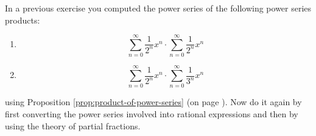 In a previous exercise you computed the power series of the following
power series products:
  \begin{enumerate}[nosep,label=(\alph*)]
  \item
    \[
    \sum_{n=0}^\infty \frac{1}{2^n} x^n
    \cdot
    \sum_{n=0}^\infty \frac{1}{2^n} x^n
    \]
  \item 
    \[
    \sum_{n=0}^\infty \frac{1}{2^n} x^n
    \cdot
    \sum_{n=0}^\infty \frac{1}{3^n} x^n
    \]
  \end{enumerate}
  using Proposition \ref{prop:product-of-power-series}
  (on page \pageref{prop:product-of-power-series}).
  Now do it again by first converting the power series involved into rational
  expressions
  and then by using the theory of partial fractions.
